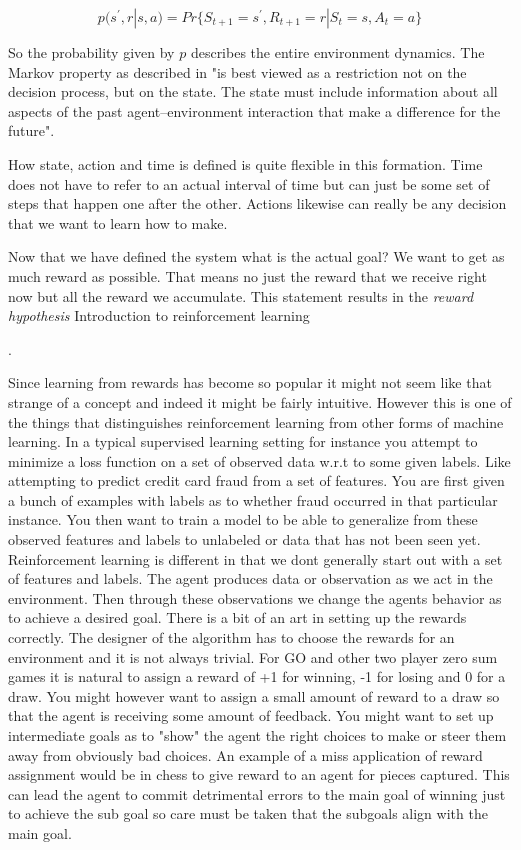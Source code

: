 $$ p(s^{'},r | s, a) = Pr\{S_{t + 1} = s^{'}, R_{t + 1} = r | S_{t} = s, A_{t} = a\}$$

So the probability given by $p$ describes the entire environment dynamics. The Markov property as described in \cite{sutton} "is best viewed as a restriction not on the decision process, but on the state. The state must include information about all aspects of the past agent–environment interaction that make a difference for the future".

How state, action and time is defined is quite flexible in this formation. Time does not have to refer to an actual interval of time but can just be some set of steps that happen one after the other. Actions likewise can really be any decision that we want to learn how to make. 

Now that we have defined the system what is the actual goal? We want to get as much reward as possible. That means no just the reward that we receive right now but all the reward we accumulate. This statement results in the \textit{reward hypothesis} {Introduction to reinforcement learning}

.

Since learning from rewards has become so popular it might not seem like that strange of a concept and indeed it might be fairly intuitive. However this is one of the things that distinguishes reinforcement learning from other forms of machine learning. In a typical supervised learning setting for instance you attempt to minimize a loss function on a set of observed data w.r.t to some given labels. Like attempting to predict credit card fraud from a set of features. You are first given a bunch of examples with labels as to whether fraud occurred in that particular instance. You then want to train a model to be able to generalize from these observed features and labels to unlabeled or data that has not been seen yet. Reinforcement learning is different in that we dont generally start out with a set of features and labels. The agent produces data or observation as we act in the environment. Then through these observations we change the agents behavior as to achieve a desired goal. There is a bit of an art in setting up the rewards correctly. The designer of the algorithm has to choose the rewards for an environment and it is not always trivial. For GO and other two player zero sum games it is natural to assign a reward of +1 for winning, -1 for losing and 0 for a draw. You might however want to assign a small amount of reward to a draw so that the agent is receiving some amount of feedback. You might want to set up intermediate goals as to "show" the agent the right choices to make or steer them away from obviously bad choices. An example of a miss application of reward assignment would be in chess to give reward to an agent for pieces captured. This can lead the agent to commit detrimental errors to the main goal of winning just to achieve the sub goal so care must be taken that the subgoals align with the main goal. 

